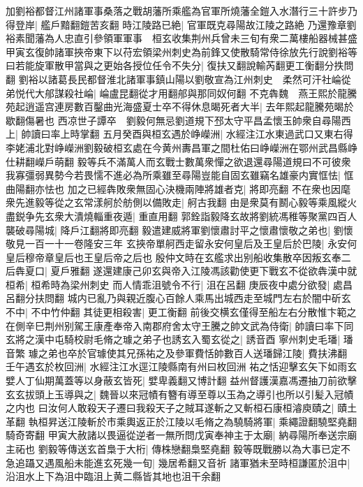 加劉裕都督江州諸軍事桑落之戰胡藩所乘艦為官軍所燒藩全鎧入水潛行三十許步乃得登岸|{
	艦戶黯翻鎧苦亥翻}
時江陵路已絶|{
	官軍既克尋陽故江陵之路絶}
乃還豫章劉裕素聞藩為人忠直引參領軍軍事　桓玄收集荆州兵曾未三旬有衆二萬樓船器械甚盛甲寅玄復帥諸軍挾帝東下以苻宏領梁州刺史為前鋒又使散騎常侍徐放先行說劉裕等曰若能旋軍散甲當與之更始各授位任令不失分|{
	復扶又翻說輸芮翻更工衡翻分抶問翻}
劉裕以諸葛長民都督淮北諸軍事鎮山陽以劉敬宣為江州刺史　柔然可汗社崘從弟悦代大郍謀殺社崘|{
	崘盧昆翻從才用翻郍與那同奴何翻}
不克犇魏　燕王熙於龍騰苑起逍遥宫連房數百鑿曲光海盛夏士卒不得休息暍死者大半|{
	去年熙起龍騰苑暍於歇翻傷暑也}
西凉世子譚卒　劉毅何無忌劉道規下邳太守平昌孟懷玉帥衆自尋陽西上|{
	帥讀曰率上時掌翻}
五月癸酉與桓玄遇於峥嶸洲|{
	水經注江水東過武口又東右得李姥浦北對峥嶸洲劉毅破桓玄處在今黄州夀昌軍之間杜佑曰峥嶸洲在鄂州武昌縣峥仕耕翻嶸戶萌翻}
毅等兵不滿萬人而玄戰士數萬衆憚之欲退還尋陽道規曰不可彼衆我寡彊弱異勢今若畏懦不進必為所乘雖至尋陽豈能自固玄雖竊名雄豪内實恇怯|{
	恇曲陽翻亦怯也}
加之已經犇敗衆無固心決機兩陣將雄者克|{
	將即亮翻}
不在衆也因麾衆先進毅等從之玄常漾舸於舫側以備敗走|{
	舸古我翻}
由是衆莫有鬭心毅等乘風縱火盡鋭争先玄衆大潰燒輜重夜遁|{
	重直用翻}
郭銓詣毅降玄故將劉統馮稚等聚黨四百人襲破尋陽城|{
	降戶江翻將即亮翻}
毅遣建威將軍劉懷肅討平之懷肅懷敬之弟也|{
	劉懷敬見一百一十一卷隆安三年}
玄挾帝單舸西走留永安何皇后及王皇后於巴陵|{
	永安何皇后穆帝章皇后也王皇后帝之后也}
殷仲文時在玄艦求出别船收集散卒因叛玄奉二后犇夏口|{
	夏戶雅翻}
遂還建康己卯玄與帝入江陵馮該勸使更下戰玄不從欲犇漢中就桓希|{
	桓希時為梁州刺史}
而人情乖沮號令不行|{
	沮在呂翻}
庚辰夜中處分欲發|{
	處昌呂翻分扶問翻}
城内已亂乃與親近腹心百餘人乘馬出城西走至城門左右於闇中斫玄不中|{
	不中竹仲翻}
其徒更相殺害|{
	更工衡翻}
前後交横玄僅得至船左右分散惟卞範之在側辛巳荆州别駕王康產奉帝入南郡府舍太守王騰之帥文武為侍衛|{
	帥讀曰率下同}
玄將之漢中屯騎校尉毛脩之璩之弟子也誘玄入蜀玄從之|{
	誘音酉}
寧州刺史毛璠|{
	璠音繁}
璩之弟也卒於官璩使其兄孫祐之及參軍費恬帥數百人送璠歸江陵|{
	費扶沸翻}
壬午遇玄於枚回洲|{
	水經注江水逕江陵縣南有州曰枚回洲}
祐之恬迎擊玄矢下如雨玄嬖人丁仙期萬蓋等以身蔽玄皆死|{
	嬖卑義翻又博計翻}
益州督護漢嘉馮遷抽刀前欲擊玄玄拔頭上玉導與之|{
	魏晉以來冠幘有簪有導至尊以玉為之導引也所以引髪入冠幘之内也}
曰汝何人敢殺天子遷曰我殺天子之賊耳遂斬之又斬桓石康桓濬庾賾之|{
	賾土革翻}
執桓昇送江陵斬於市乘輿返正於江陵以毛脩之為驍騎將軍|{
	乘繩證翻驍堅堯翻騎奇寄翻}
甲寅大赦諸以畏逼從逆者一無所問戊寅奉神主于太廟|{
	納尋陽所奉送宗廟主祏也}
劉毅等傳送玄首梟于大桁|{
	傳株戀翻梟堅堯翻}
毅等既戰勝以為大事已定不急追躡又遇風船未能進玄死幾一旬|{
	幾居希翻又音祈}
諸軍猶未至時桓謙匿於沮中|{
	沿沮水上下為沮中臨沮上黄二縣皆其地也沮干余翻}
